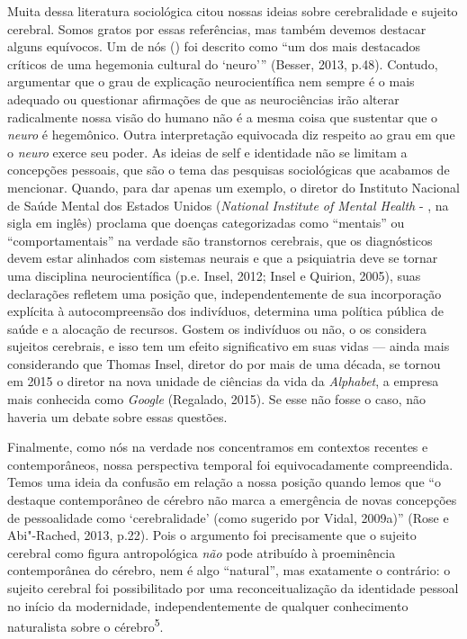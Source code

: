 Muita dessa literatura sociológica citou nossas ideias sobre
cerebralidade e sujeito cerebral. Somos gratos por essas referências,
mas também devemos destacar alguns equívocos. Um de nós () foi
descrito como ``um dos mais destacados críticos de uma hegemonia
cultural do `neuro''' (Besser, 2013, p.48). Contudo, argumentar que o
grau de explicação neurocientífica nem sempre é o mais adequado ou
questionar afirmações de que as neurociências irão alterar radicalmente
nossa visão do humano não é a mesma coisa que sustentar que o
\emph{neuro} é hegemônico. Outra interpretação equivocada diz respeito
ao grau em que o \emph{neuro} exerce seu poder. As ideias de self e
identidade não se limitam a concepções pessoais, que são o tema das
pesquisas sociológicas que acabamos de mencionar. Quando, para dar
apenas um exemplo, o diretor do Instituto Nacional de Saúde Mental dos
Estados Unidos (\emph{National Institute of Mental Health} - , na
sigla em inglês) proclama que doenças categorizadas como ``mentais'' ou
``comportamentais'' na verdade são transtornos cerebrais, que os
diagnósticos devem estar alinhados com sistemas neurais e que a
psiquiatria deve se tornar uma disciplina neurocientífica (p.e. Insel,
2012; Insel e Quirion, 2005), suas declarações refletem uma posição que,
independentemente de sua incorporação explícita à autocompreensão dos
indivíduos, determina uma política pública de saúde e a alocação de
recursos. Gostem os indivíduos ou não, o  os considera sujeitos
cerebrais, e isso tem um efeito significativo em suas vidas --- ainda
mais considerando que Thomas Insel, diretor do  por mais de uma
década, se tornou em 2015 o diretor na nova unidade de ciências da vida
da \emph{Alphabet}, a empresa mais conhecida como \emph{Google}
(Regalado, 2015). Se esse não fosse o caso, não haveria um debate sobre
essas questões.

Finalmente, como nós na verdade nos concentramos em contextos recentes e
contemporâneos, nossa perspectiva temporal foi equivocadamente
compreendida. Temos uma ideia da confusão em relação a nossa posição
quando lemos que ``o destaque contemporâneo de cérebro não marca a
emergência de novas concepções de pessoalidade como `cerebralidade'
(como sugerido por Vidal, 2009a)'' (Rose e Abi"-Rached, 2013, p.22). Pois
o argumento foi precisamente que o sujeito cerebral como figura
antropológica \emph{não} pode atribuído à proeminência contemporânea do
cérebro, nem é algo ``natural'', mas exatamente o contrário: o sujeito
cerebral foi possibilitado por uma reconceitualização da identidade
pessoal no início da modernidade, independentemente de qualquer
conhecimento naturalista sobre o cérebro\textsuperscript{5}.


